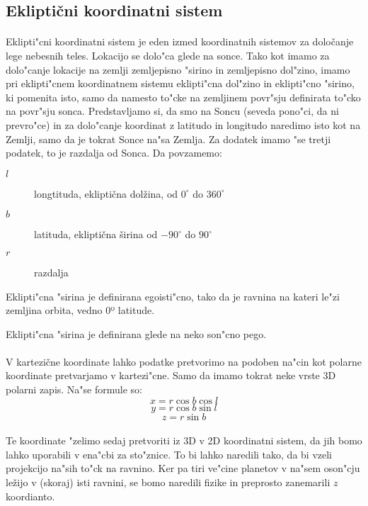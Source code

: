 \subsection*{Ekliptični koordinatni sistem}
\label{eklipticni_sistem}
	
\paragraph{}
Eklipti"cni koordinatni sistem je eden izmed koordinatnih sistemov za določanje lege nebesnih teles. Lokacijo se dolo"ca glede na sonce. Tako kot imamo za dolo"canje lokacije na zemlji zemljepisno "sirino in zemljepisno dol"zino, imamo pri eklipti"cnem koordinatnem sistemu eklipti"cna dol"zino in eklipti"cno "sirino, ki pomenita isto, samo da namesto to"cke na zemljinem povr"sju definirata to"cko na povr"sju sonca. Predstavljamo si, da smo na Soncu (seveda pono"ci, da ni prevro"ce) in za dolo"canje koordinat z latitudo in longitudo naredimo isto kot na Zemlji, samo da je tokrat Sonce na"sa Zemlja. Za dodatek imamo "se tretji podatek, to je razdalja od Sonca. Da povzamemo:
\begin{description}
	\item[$l$] longtituda, ekliptična dolžina, od $0^\circ$ do $360^\circ$
	\item[$b$] latituda, ekliptična širina od $-90^\circ$ do $90^\circ$
	\item[$r$] razdalja
\end{description}

Eklipti"cna "sirina je definirana egoisti"cno, tako da je ravnina na kateri le"zi zemljina orbita, vedno 0º latitude.

Eklipti"cna "sirina je definirana glede na neko son"cno pego.

\paragraph{}
V kartezične koordinate lahko podatke pretvorimo na podoben na"cin kot polarne koordinate pretvarjamo v kartezi"cne. Samo da imamo tokrat neke vrste 3D polarni zapis. Na"se formule so:
$$x = r \cos b \cos l$$
$$y = r \cos b \sin l$$
$$z = r \sin b$$

\paragraph{}
Te koordinate "zelimo sedaj pretvoriti iz 3D v 2D koordinatni sistem, da jih bomo lahko uporabili v ena"cbi za sto"znice. To bi lahko naredili tako, da bi vzeli projekcijo na"sih to"ck na ravnino. Ker pa tiri ve"cine planetov v na"sem oson"cju ležijo v (skoraj) isti ravnini, se bomo naredili fizike in preprosto zanemarili $z$ koordianto.